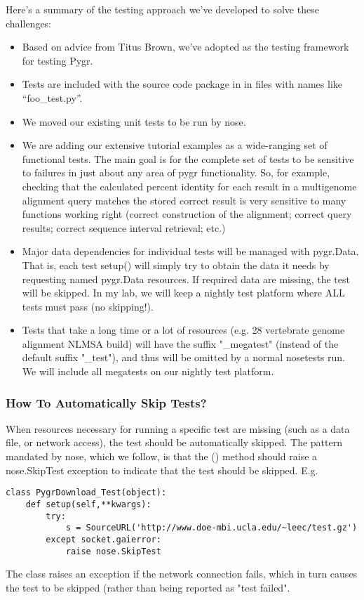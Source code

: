 \documentclass{howto}
\begin{document}
Here's a summary of the testing approach we've developed to solve these challenges:
\begin{itemize}
\item Based on advice from Titus Brown, we've adopted  as the testing
framework for testing Pygr.
\item Tests are included with the source code package
in  in files with names like ``foo_test.py''.
\item We moved our existing unit tests to be run by nose.
\item We are adding our extensive tutorial examples as a wide-ranging set of functional tests.  The main goal is for the complete set of tests to be sensitive to failures in just about any area of pygr functionality.  So, for example, checking that the calculated percent identity for each result in a multigenome alignment query matches the stored correct result is very sensitive to many functions working right (correct construction of the alignment; correct query results; correct sequence interval retrieval; etc.)
\item Major data dependencies for individual tests will be managed with pygr.Data.  That is, each test setup() will simply try to obtain the data it needs by requesting named pygr.Data resources.  If required data are missing, the test will be skipped.  In my lab, we will keep a nightly test platform where ALL tests must pass (no skipping!).
\item Tests that take a long time or a lot of resources (e.g. 28 vertebrate genome alignment NLMSA build) will have the suffix "_megatest" (instead of the default suffix "_test"), and thus will be omitted by a normal nosetests run.  We will include all megatests on our nightly test platform.  
\end{itemize}

\subsubsection{How To Automatically Skip Tests?}
When resources necessary for running a specific test are missing
(such as a data file, or network access), the test should be automatically
skipped.  The pattern mandated by nose, which we follow, is that the 
() method should raise a nose.SkipTest exception to 
indicate that the test should be skipped.  E.g.
\begin{verbatim}
class PygrDownload_Test(object):
    def setup(self,**kwargs):
        try:
            s = SourceURL('http://www.doe-mbi.ucla.edu/~leec/test.gz')
        except socket.gaierror:
            raise nose.SkipTest
\end{verbatim}
The  class raises an exception if the network connection
fails, which in turn causes the test to be skipped (rather than being 
reported as "test failed".
\end{document}
